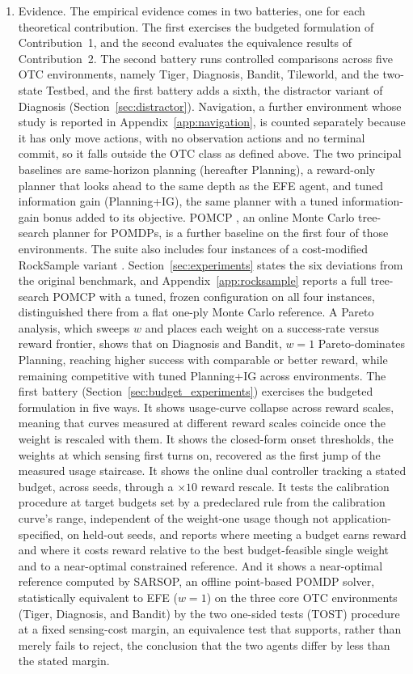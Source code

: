 \begin{enumerate}
    \item Evidence. The empirical evidence comes in two batteries, one for each theoretical contribution. The first exercises the budgeted formulation of Contribution~1, and the second evaluates the equivalence results of Contribution~2. The second battery runs controlled comparisons across five OTC environments, namely Tiger, Diagnosis, Bandit, Tileworld, and the two-state Testbed, and the first battery adds a sixth, the distractor variant of Diagnosis (Section~\ref{sec:distractor}). Navigation, a further environment whose study is reported in Appendix~\ref{app:navigation}, is counted separately because it has only move actions, with no observation actions and no terminal commit, so it falls outside the OTC class as defined above. The two principal baselines are same-horizon planning (hereafter Planning), a reward-only planner that looks ahead to the same depth as the EFE agent, and tuned information gain (Planning+IG), the same planner with a tuned information-gain bonus added to its objective. POMCP \citep{silver2010}, an online Monte Carlo tree-search planner for POMDPs, is a further baseline on the first four of those environments. The suite also includes four instances of a cost-modified RockSample variant \citep{smith2004}. Section~\ref{sec:experiments} states the six deviations from the original benchmark, and Appendix~\ref{app:rocksample} reports a full tree-search POMCP with a tuned, frozen configuration on all four instances, distinguished there from a flat one-ply Monte Carlo reference. A Pareto analysis, which sweeps $w$ and places each weight on a success-rate versus reward frontier, shows that on Diagnosis and Bandit, $w{=}1$ Pareto-dominates Planning, reaching higher success with comparable or better reward, while remaining competitive with tuned Planning+IG across environments. The first battery (Section~\ref{sec:budget_experiments}) exercises the budgeted formulation in five ways. It shows usage-curve collapse across reward scales, meaning that curves measured at different reward scales coincide once the weight is rescaled with them. It shows the closed-form onset thresholds, the weights at which sensing first turns on, recovered as the first jump of the measured usage staircase. It shows the online dual controller tracking a stated budget, across seeds, through a $\times 10$ reward rescale. It tests the calibration procedure at target budgets set by a predeclared rule from the calibration curve's range, independent of the weight-one usage though not application-specified, on held-out seeds, and reports where meeting a budget earns reward and where it costs reward relative to the best budget-feasible single weight and to a near-optimal constrained reference. And it shows a near-optimal reference computed by SARSOP, an offline point-based POMDP solver, statistically equivalent to EFE ($w{=}1$) on the three core OTC environments (Tiger, Diagnosis, and Bandit) by the two one-sided tests (TOST) procedure at a fixed sensing-cost margin, an equivalence test that supports, rather than merely fails to reject, the conclusion that the two agents differ by less than the stated margin.

\end{enumerate}
